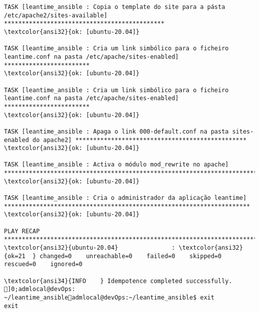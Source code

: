 \documentclass{scrartcl}
\begin{document}
\begin{Verbatim}
TASK [leantime_ansible : Copia o template do site para a pásta /etc/apache2/sites-available] *********************************************
\textcolor{ansi32}{ok: [ubuntu-20.04]}

TASK [leantime_ansible : Cria um link simbólico para o ficheiro leantime.conf na pasta /etc/apache/sites-enabled] ************************
\textcolor{ansi32}{ok: [ubuntu-20.04]}

TASK [leantime_ansible : Cria um link simbólico para o ficheiro leantime.conf na pasta /etc/apache/sites-enabled] ************************
\textcolor{ansi32}{ok: [ubuntu-20.04]}

TASK [leantime_ansible : Apaga o link 000-default.conf na pasta sites-enabled do apache2] ************************************************
\textcolor{ansi32}{ok: [ubuntu-20.04]}

TASK [leantime_ansible : Activa o módulo mod_rewrite no apache] **************************************************************************
\textcolor{ansi32}{ok: [ubuntu-20.04]}

TASK [leantime_ansible : Cria o administrador da aplicação leantime] *********************************************************************
\textcolor{ansi32}{ok: [ubuntu-20.04]}

PLAY RECAP *******************************************************************************************************************************
\textcolor{ansi32}{ubuntu-20.04}               : \textcolor{ansi32}{ok=21  } changed=0    unreachable=0    failed=0    skipped=0    rescued=0    ignored=0

\textcolor{ansi34}{INFO    } Idempotence completed successfully.
]0;admlocal@devOps: ~/leantime_ansibleadmlocal@devOps:~/leantime_ansible$ exit
exit

\end{Verbatim}
\end{document}
